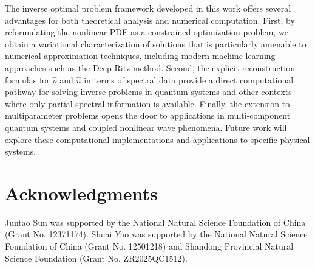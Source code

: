\documentclass[12pt,thmsa]{article}
\begin{document}
The inverse optimal problem framework developed in this work offers several
advantages for both theoretical analysis and numerical computation. First,
by reformulating the nonlinear PDE as a constrained optimization problem, we
obtain a variational characterization of solutions that is particularly
amenable to numerical approximation techniques, including modern machine
learning approaches such as the Deep Ritz method. Second, the explicit
reconstruction formulas for $\hat{\rho}$ and $\hat{u}$ in terms of spectral
data provide a direct computational pathway for solving inverse problems in
quantum systems and other contexts where only partial spectral information
is available. Finally, the extension to multiparameter problems opens the
door to applications in multi-component quantum systems and coupled
nonlinear wave phenomena. Future work will explore these computational
implementations and applications to specific physical systems.

\section*{Acknowledgments}

Juntao Sun was supported by the National Natural Science Foundation of China
(Grant No. 12371174). Shuai Yao was supported by the National Natural
Science Foundation of China (Grant No. 12501218) and Shandong Provincial
Natural Science Foundation (Grant No. ZR2025QC1512).
\end{document}

